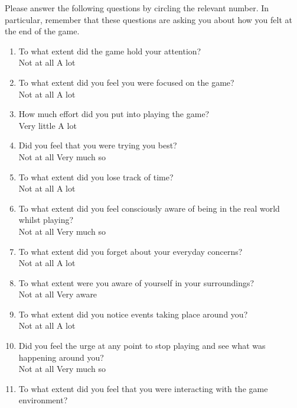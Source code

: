 \documentclass[../II2202-proposal.tex]{subfiles}
\begin{document}
Please answer the following questions by circling the relevant number.
In particular, remember that these questions are asking you about how you felt at the end of the game.

\begin{enumerate}
    \item To what extent did the game hold your attention? \\
    Not at all      \quad A lot
    \item To what extent did you feel you were focused on the game? \\
    Not at all      \quad A lot
    \item How much effort did you put into playing the game? \\
    Very little      \quad A lot
    \item Did you feel that you were trying you best? \\
    Not at all      \quad Very much so
    \item To what extent did you lose track of time? \\
    Not at all      \quad A lot
    \item To what extent did you feel consciously aware of being in the real world whilst playing? \\
    Not at all      \quad Very much so
    \item To what extent did you forget about your everyday concerns? \\
    Not at all      \quad A lot
    \item To what extent were you aware of yourself in your surroundings? \\
    Not at all      \quad Very aware
    \item To what extent did you notice events taking place around you?  \\
    Not at all      \quad A lot
    \item Did you feel the urge at any point to stop playing and see what was happening around you? \\
    Not at all      \quad Very much so
    \item To what extent did you feel that you were interacting with the game environment? \\

\end{enumerate}
\end{document}
